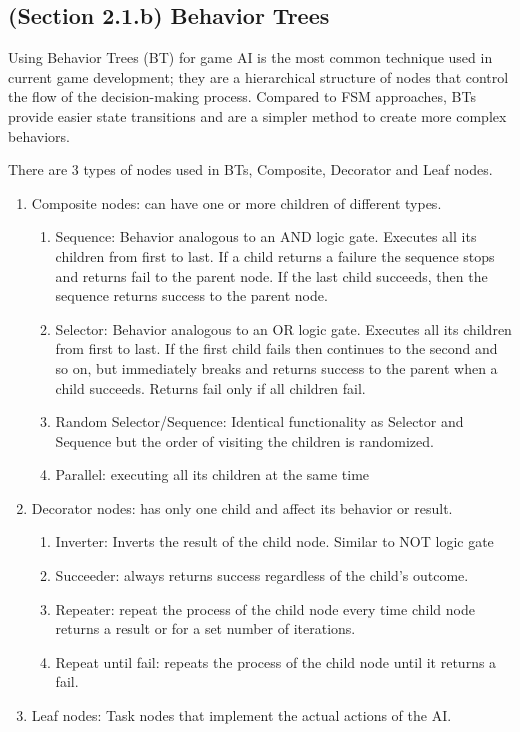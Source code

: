 \documentclass[a4paper,one side,12pt]{book}
\begin{document}
\subsection{(Section 2.1.b) Behavior Trees}

Using Behavior Trees (BT) for game AI is the most common technique used
in current game development; they are a hierarchical structure of nodes
that control the flow of the decision-making process. Compared to FSM
approaches, BTs provide easier state transitions and are a simpler
method to create more complex behaviors. \cite{sekhavat_2017_behavior}

There are 3 types of nodes used in BTs, Composite, Decorator and Leaf
nodes.

\begin{enumerate}
\def\labelenumi{\arabic{enumi}.}
\item
  Composite nodes: can have one or more children of different types.

  \begin{enumerate}
  \def\labelenumii{\alph{enumii}.}
  \item
    Sequence: Behavior analogous to an AND logic gate. Executes all its
    children from first to last. If a child returns a failure the
    sequence stops and returns fail to the parent node. If the last
    child succeeds, then the sequence returns success to the parent
    node.
  \item
    Selector: Behavior analogous to an OR logic gate. Executes all its
    children from first to last. If the first child fails then continues
    to the second and so on, but immediately breaks and returns success
    to the parent when a child succeeds. Returns fail only if all
    children fail.
  \item
    Random Selector/Sequence: Identical functionality as Selector and
    Sequence but the order of visiting the children is randomized.
  \item
    Parallel: executing all its children at the same time
  \end{enumerate}
\item
  Decorator nodes: has only one child and affect its behavior or result.

  \begin{enumerate}
  \def\labelenumii{\alph{enumii}.}
  \item
    Inverter: Inverts the result of the child node. Similar to NOT logic
    gate
  \item
    Succeeder: always returns success regardless of the child's outcome.
  \item
    Repeater: repeat the process of the child node every time child node
    returns a result or for a set number of iterations.
  \item
    Repeat until fail: repeats the process of the child node until it
    returns a fail.
  \end{enumerate}
\item
  Leaf nodes: Task nodes that implement the actual actions of the AI.
\end{enumerate}
\end{document}
